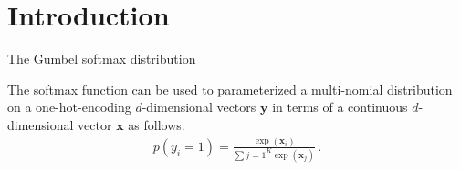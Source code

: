 
\section{Introduction}

The Gumbel softmax distribution 

The softmax function can be used to parameterized a multi-nomial distribution
on a one-hot-encoding $d$-dimensional vectors $\mathbf{y}$ in terms of a continuous 
$d$-dimensional vector $\mathbf{x}$ as follows:
\begin{align}
p(y_i=1) = \frac{\exp(\mathbf{x}_i)}{\sum{j=1}^K\exp(\mathbf{x}_j)}\,.
\end{align}


